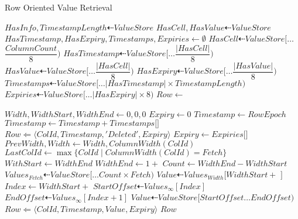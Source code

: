 \documentclass[fleqn]{article}
\begin{document}
\begin{algorithm}
\scriptsize
\caption{Row Oriented Value Retrieval}
\begin{algorithmic}[2]
\State $HasInfo, TimestampLength \dashleftarrow ValueStore$
\State $HasCell, HasValue \dashleftarrow ValueStore$
\State $HasTimestamp, HasExpiry, Timestamps, Expiries \gets \emptyset$
 \State $HasCell \dashleftarrow ValueStore[\dots $\tiny$\dfrac{ColumnCount}{8})$\scriptsize
\EndIf
{}
 \State $HasTimestamp \dashleftarrow ValueStore[\dots $\tiny$\dfrac{\lvert HasCell \rvert}{8})$\scriptsize
\EndIf
{}
 \State $HasValue \dashleftarrow ValueStore[\dots $\tiny$\dfrac{\lvert HasCell \rvert}{8})$\scriptsize
\EndIf
{}
 \State $HasExpiry\dashleftarrow ValueStore[\dots $\tiny$\dfrac{\lvert HasValue \rvert}{8})$\scriptsize
\EndIf
{}
 \State $Timestamps \dashleftarrow ValueStore[\dots $\tiny$\lvert HasTimestamp \rvert \times TimestampLength)$\scriptsize
\EndIf
{}
 \State $Expiries \dashleftarrow ValueStore[\dots $\tiny$\lvert HasExpiry \rvert \times 8)$\scriptsize
\EndIf
\Statex
\State $Row \gets $ 

\State $Width, WidthStart, WidthEnd \gets 0, 0, 0$
  \State $Expiry \gets 0$
  \State $Timestamp \gets RowEpoch$
   \State $Timestamp \gets Timestamp + Timestamps[$$]$
  \EndIf
   \State $Row \Leftarrow \langle ColId, Timestamp, 'Deleted', Expiry \rangle$
  \Else
    \State $Expiry \gets Expiries[$$]$
   \EndIf
    \State $PrevWidth, Width \gets Width, ColumnWidth(ColId)$
     \State $LastColId \gets \max{\{ColId \mid ColumnWidth(ColId) = Fetch\}}$
     \State $WithStart \gets WidthEnd$
     \State $WidthEnd \gets 1 + $ 
     \State $Count \gets WidthEnd - WidthStart$
     \State $Values_{Fetch} \dashleftarrow ValueStore[\dots Count \times Fetch)$
    \EndFor
   \EndIf
    \State $Value \dashleftarrow Values_{Width}[WidthStart + $ $]$
   \Else
    \State $Index \gets WidthStart + $ 
    \State $StartOffset \dashleftarrow Values_{\infty}[Index]$
    \State $EndOffset \dashleftarrow Values_{\infty}[Index + 1]$
    \State $Value \dashleftarrow ValueStore[StartOffset \dots EndOffset)$
   \EndIf
   \State $Row \Leftarrow \langle ColId, Timestamp, Value, Expiry \rangle$
  \EndIf
 \EndIf
\EndFor
\State \Return $Row$
\EndFunction
\end{algorithmic}
\end{algorithm}
\end{document}
